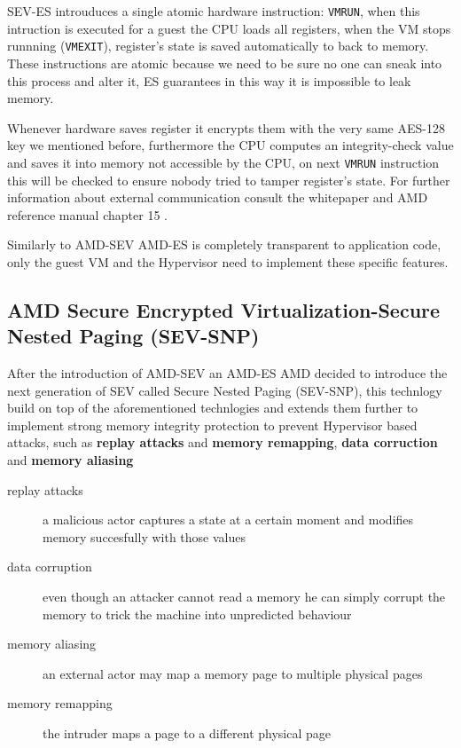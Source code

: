 \documentclass[twocolumn]{article}
\begin{document}
    SEV-ES introuduces a single atomic hardware instruction: \texttt{VMRUN}, when this intruction is executed for a guest the CPU loads all registers, when the VM stops runnning (\texttt{VMEXIT}), register's state is saved automatically to  back to memory. These instructions are atomic because we need to be sure no one can sneak into this process and alter it, ES guarantees in this way it is impossible to leak memory.

    Whenever hardware saves register it encrypts them with the very same AES-128 key we mentioned before, furthermore the CPU computes an integrity-check value and saves it into memory not accessible by the CPU, on next \texttt{VMRUN} instruction this will be checked to ensure nobody tried to tamper register's state. For further information about external communication consult the whitepaper \cite{protecting-registers} and AMD reference manual chapter 15 \cite{architecture-reference}.

    Similarly to AMD-SEV AMD-ES is completely transparent to application code, only the guest VM and the Hypervisor need to implement these specific features.

\subsection{AMD Secure Encrypted Virtualization-Secure Nested Paging (SEV-SNP)}

    After the introduction of AMD-SEV an AMD-ES AMD decided to introduce the next generation of SEV called Secure Nested Paging (SEV-SNP), this technlogy build on top of the aforementioned technlogies and extends them further to implement strong memory integrity protection to prevent Hypervisor based attacks, such as \textbf{replay attacks} and \textbf{memory remapping}, \textbf{data corruction} and \textbf{memory aliasing}

    \begin{description}
        \item[replay attacks] a malicious actor captures a state at a certain moment and modifies memory succesfully with those values
        \item[data corruption] even though an attacker cannot read a memory he can simply corrupt the memory to trick the machine into unpredicted behaviour
        \item[memory aliasing] an external actor may map a memory page to multiple physical pages
        \item[memory remapping] the intruder maps a page to a different physical page
    \end{description}
\end{document}
